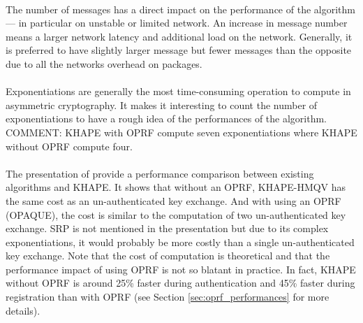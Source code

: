 ﻿\documentclass[../report.tex]{subfiles}
\begin{document}
\paragraph{}
The number of messages has a direct impact on the performance of the algorithm --- in particular on unstable or limited network. An increase in message number means a larger network latency and additional load on the network. Generally, it is preferred to have slightly larger message but fewer messages than the opposite due to all the networks overhead on packages.
\paragraph{}
Exponentiations are generally the most time-consuming operation to compute in asymmetric cryptography. It makes it interesting to count the number of exponentiations to have a rough idea of the performances of the algorithm.
COMMENT: KHAPE with OPRF compute seven exponentiations where KHAPE without OPRF compute four.
\paragraph{}
The presentation of \cite{KHAPE_Paper} provide a performance comparison between existing algorithms and KHAPE. It shows that without an OPRF, KHAPE-HMQV has the same cost as an un-authenticated key exchange. And with using an OPRF (OPAQUE), the cost is similar to the computation of two un-authenticated key exchange.
SRP is not mentioned in the presentation but due to its complex exponentiations, it would probably be more costly than a single un-authenticated key exchange.
Note that the cost of computation is theoretical and that the performance impact of using OPRF is not so blatant in practice. In fact, KHAPE without OPRF is around 25\% faster during authentication and 45\% faster during registration than with OPRF (see Section \ref{sec:oprf_performances} for more details).
\end{document}

